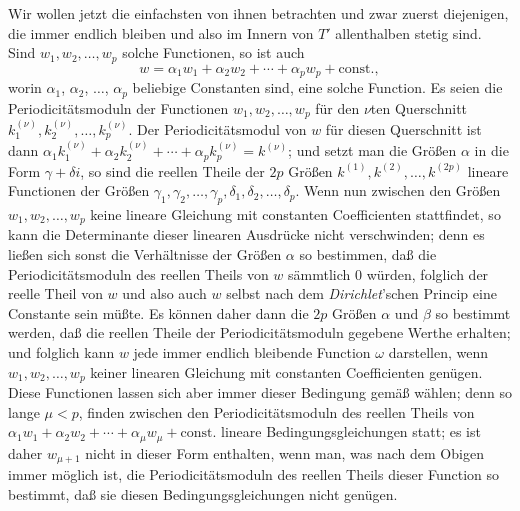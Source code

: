 \documentclass{article}
\begin{document}
Wir wollen jetzt die einfachsten von ihnen betrachten und zwar zuerst diejenigen, die immer endlich bleiben und also im Innern von $T'$ allenthalben stetig sind. Sind $w_{1}, w_{2}, \ldots, w_{p}$ solche Functionen, so ist auch
\[ w = \alpha_{1} w_{1} + \alpha_{2} w_{2} + \cdots + \alpha_{p} w_{p} + \text{const.}, \]
worin $\alpha_{1}$, $\alpha_{2}$, $\ldots$, $\alpha_{p}$ beliebige Constanten sind, eine solche Function. Es seien die Periodicitätsmoduln der Functionen $w_{1}, w_{2}, \ldots, w_{p}$ für den $\nu$ten Querschnitt $k_{1}^{(\nu)}, k_{2}^{(\nu)}, \ldots, k_{p}^{(\nu)}$. Der Periodicitätsmodul von $w$ für diesen Querschnitt ist dann $\alpha_{1} k_{1}^{(\nu)} + \alpha_{2} k_{2}^{(\nu)} + \cdots + \alpha_{p} k_{p}^{(\nu)} = k^{(\nu)}$; und setzt man die Größen $\alpha$ in die Form $\gamma + \delta i$, so sind die reellen Theile der $2p$ Größen $k^{(1)}, k^{(2)}, \ldots, k^{(2p)}$ lineare Functionen der Größen $\gamma_{1}, \gamma_{2}, \ldots, \gamma_{p}, \delta_{1}, \delta_{2}, \ldots, \delta_{p}$. Wenn nun zwischen den Größen $w_{1}, w_{2}, \ldots, w_{p}$ keine lineare Gleichung mit constanten Coefficienten stattfindet, so kann die Determinante dieser linearen Ausdrücke nicht verschwinden; denn es ließen sich sonst die Verhältnisse der Größen $\alpha$ so bestimmen, daß die Periodicitätsmoduln des reellen Theils von $w$ sämmtlich 0 würden, folglich der reelle Theil von $w$ und also auch $w$ selbst nach dem \emph{Dirichlet}'schen Princip eine Constante sein müßte. Es können daher dann die $2p$ Größen $\alpha$ und $\beta$ so bestimmt werden, daß die reellen Theile der Periodicitätsmoduln gegebene Werthe erhalten; und folglich kann $w$ jede immer endlich bleibende Function $\omega$ darstellen, wenn $w_{1}, w_{2}, \ldots, w_{p}$ keiner linearen Gleichung mit constanten Coefficienten genügen. Diese Functionen lassen sich aber immer dieser Bedingung gemäß wählen; denn so lange $\mu < p$, finden zwischen den Periodicitätsmoduln des reellen Theils von $\alpha_{1} w_{1} + \alpha_{2} w_{2} + \cdots + \alpha_{\mu} w_{\mu} + \text{const.}$ lineare Bedingungsgleichungen statt; es ist daher $w_{\mu+1}$ nicht in dieser Form enthalten, wenn man, was nach dem Obigen immer möglich ist, die Periodicitätsmoduln des reellen Theils dieser Function so bestimmt, daß sie diesen Bedingungsgleichungen nicht genügen.
\end{document}
